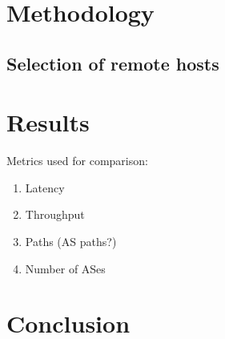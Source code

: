 \documentclass{sig-alternate-10pt}
\begin{document}
\section{Methodology}

\subsection{Selection of remote hosts}

\section{Results}

Metrics used for comparison:

\begin{enumerate}
\item Latency
\item Throughput
\item Paths (AS paths?)
\item Number of ASes
\end{enumerate}


\section{Conclusion}




\end{document}
